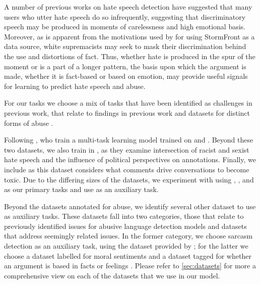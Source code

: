 A number of previous works on hate speech detection have suggested that many users who utter hate speech do so infrequently, suggesting that discriminatory speech may be produced in moments of carelessness and high emotional basis. Moreover, as is apparent from the motivations used by \citet{Garcia:2019} for using StormFront as a data source, white supremacists may seek to mask their discrimination behind the use and distortions of fact. Thus, whether hate is produced in the spur of the moment or is a part of a longer pattern, the basis upon which the argument is made, whether it is fact-based or based on emotion, may provide useful signals for learning to predict hate speech and abuse.

For our tasks we choose a mix of tasks that have been identified as challenges in previous work, that relate to findings in previous work \cite{Waseem-Hovy:2016,Davidson:2017,Schmidt:2017} and datasets for distinct forms of abuse \cite{Waseem:2016,Waseem-Hovy:2016,Davidson:2017,Wulczyn:2017}.

Following \citet{Waseem:2018}, who train a multi-task learning model trained on \citet{Waseem-Hovy:2016} and \citet{Davidson:2017}. Beyond these two datasets, we also train in \citet{Waseem:2016}, as they examine intersection of racist and sexist hate speech and the influence of political perspectives on annotations. Finally, we include \citet{Wulczyn:2017} as this dataset considers what comments drive conversations to become toxic. Due to the differing sizes of the datasets, we experiment with using \citet{Wulczyn:2017}, \citet{Davidson:2017}, and \citet{Waseem:2016} as our primary tasks and use \citet{Waseem-Hovy:2016} as an auxiliary task.

Beyond the datasets annotated for abuse, we identify several other dataset to use as auxiliary tasks. These datasets fall into two categories, those that relate to previously identified issues for abusive language detection models and datasets that address seemingly related issues. In the former category, we choose sarcasm detection as an auxiliary task, using the dataset provided by \citet{Oraby_sarcasm:2016}; for the latter we choose a dataset labelled for moral sentiments \citet{Hoover:2019} and a dataset tagged for whether an argument is based in facts or feelings \citet{Oraby_factfeel:2015}. Please refer to \autoref{sec:datasets} for more a comprehensive view on each of the datasets that we use in our model.

